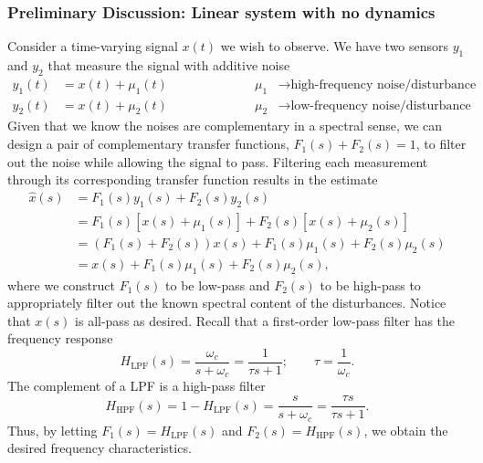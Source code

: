 \documentclass[a4paper]{article}
\begin{document}
\subsubsection*{Preliminary Discussion: Linear system with no dynamics}
Consider a time-varying signal $x(t)$ we wish to observe.
We have two sensors $y_1$ and $y_2$ that measure the signal with additive noise
\begin{equation}
\begin{split}
y_1(t) &= x(t) + \mu_1(t) \\
y_2(t) &= x(t) + \mu_2(t)
\end{split}
\qquad\qquad\qquad
\begin{split}
\mu_1 &\rightarrow \text{high-frequency noise/disturbance} \\
\mu_2 &\rightarrow \text{low-frequency noise/disturbance}
\end{split}
\end{equation}
Given that we know the noises are complementary in a spectral sense, we can design a pair of complementary transfer functions, $F_1(s) + F_2(s) = 1$, to filter out the noise while allowing the signal to pass.
Filtering each measurement through its corresponding transfer function results in the estimate
\begin{align}
\hat{x}(s) &= F_1(s)y_1(s) + F_2(s)y_2(s) \nonumber \\
           &= F_1(s)\left[x(s) + \mu_1(s)\right] + F_2(s)\left[x(s) + \mu_2(s)\right] \label{eq:scf_estimator} \\
           &= (F_1(s)+F_2(s))x(s) + F_1(s)\mu_1(s) + F_2(s)\mu_2(s) \nonumber \\
           &= x(s) + F_1(s)\mu_1(s) + F_2(s)\mu_2(s), \label{eq:scf_estimate}
\end{align}
where we construct $F_1(s)$ to be low-pass and $F_2(s)$ to be high-pass to appropriately filter out the known spectral content of the disturbances.
Notice that $x(s)$ is all-pass as desired.
Recall that a first-order low-pass filter has the frequency response
\begin{equation}
H_\text{LPF}(s) = \frac{\omega_c}{s+\omega_c} = \frac{1}{\tau s+1};\qquad\tau=\frac{1}{\omega_c}.
\end{equation}
The complement of a LPF is a high-pass filter
\begin{equation}
H_\text{HPF}(s) = 1 - H_\text{LPF}(s) = \frac{s}{s+\omega_c} = \frac{\tau s}{\tau s+1}.
\end{equation}
Thus, by letting $F_1(s)=H_\text{LPF}(s)$ and $F_2(s)=H_\text{HPF}(s)$, we obtain the desired frequency characteristics.
\end{document}
